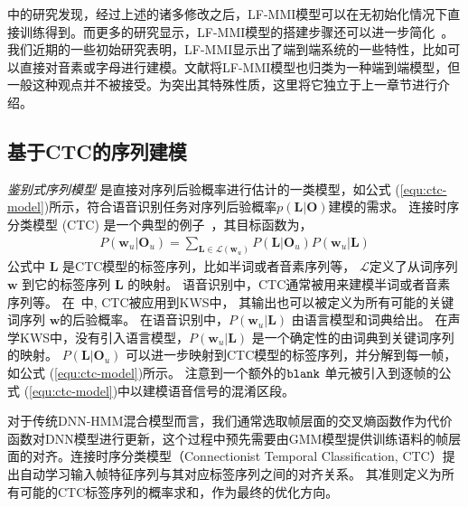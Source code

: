 \cite{povey2016purely}中的研究发现，经过上述的诸多修改之后，LF-MMI模型可以在无初始化情况下直接训练得到。而更多的研究显示，LF-MMI模型的搭建步骤还可以进一步简化~\cite{hadian2018end}。我们近期的一些初始研究表明，LF-MMI显示出了端到端系统的一些特性，比如可以直接对音素或字母进行建模。文献\cite{hadian2018end}将LF-MMI模型也归类为一种端到端模型，但一般这种观点并不被接受。为突出其特殊性质，这里将它独立于上一章节进行介绍。


\subsection{基于CTC的序列建模}
\label{Sec:sdm-sdt-intro}

{\em{鉴别式序列模型}} 是直接对序列后验概率进行估计的一类模型，如公式 (\ref{equ:ctc-model})所示，符合语音识别任务对序列后验概率$p(\mathbf{L}|\mathbf{O})$建模的需求。
连接时序分类模型 (CTC) 是一个典型的例子~\cite{graves2006connectionist,huang2018ctc}，其目标函数为，
\begin{equation}
\label{equ:ctc-formu}
\begin{split}
P(\mathbf{w}_u|\mathbf{O}_u)
= \sum_{\mathbf{L}\in\mathcal{L}(\mathbf{w}_u)} P(\mathbf{L}|\mathbf{O}_u)P(\mathbf{w}_u|\mathbf{L})
\end{split}
\end{equation}
公式中 $\mathbf{L}$ 是CTC模型的标签序列，比如半词或者音素序列等， $\mathcal{L}$定义了从词序列 $\mathbf{w}$ 到它的标签序列 $\mathbf{L}$ 的映射。
语音识别中，CTC通常被用来建模半词或者音素序列等。
在~\cite{fernandez2007application}中, CTC被应用到KWS中，
其输出也可以被定义为所有可能的关键词序列 $\mathbf{w}$的后验概率。
在语音识别中，$P(\mathbf{w}_u|\mathbf{L})$ 由语言模型和词典给出。
在声学KWS中，没有引入语言模型，$P(\mathbf{w}_u|\mathbf{L})$ 是一个确定性的由词典到关键词序列的映射。
$P(\mathbf{L}|\mathbf{O}_u)$ 可以进一步映射到CTC模型的标签序列，并分解到每一帧，如公式 (\ref{equ:ctc-model})所示。
注意到一个额外的$\tt blank$ 单元被引入到逐帧的公式 (\ref{equ:ctc-model})中以建模语音信号的混淆区段。

对于传统DNN-HMM混合模型而言，我们通常选取帧层面的交叉熵函数作为代价函数对DNN模型进行更新，这个过程中预先需要由GMM模型提供训练语料的帧层面的对齐。连接时序分类模型（Connectionist Temporal Classification, CTC）提出自动学习输入帧特征序列与其对应标签序列之间的对齐关系。
其准则定义为所有可能的CTC标签序列的概率求和，作为最终的优化方向。

